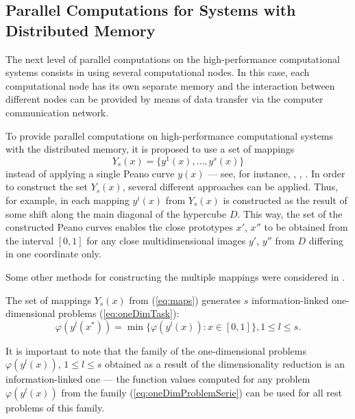 \documentclass{aims}
\theoremstyle{definition}
\begin{document}
\subsection{Parallel Computations for Systems with Distributed Memory}
\label{subsec:distribpar}
The next level of parallel computations on the high-performance computational systems
consists in using several computational nodes. In this case, each computational node has
its own separate memory and the interaction between different nodes can be provided by
means of data transfer via the computer communication network.
\par
To provide parallel computations on high-performance computational systems with the distributed memory, it is proposed to use a set of mappings
\begin{equation}
  \label{eq:maps}
Y_s(x)=\{y^1(x),\dots,y^s(x)\}
\end{equation}
instead of applying a single Peano curve \(y(x)\) --- see, for instance,
\cite{strongin1992}, \cite{stronginGergelBarkalovParGO}, \cite{strSergGO}.
In order to construct the set \(Y_s(x)\), several different approaches can be applied.
Thus, for example, in \cite{strongin1992} each mapping \(y^i(x)\) from \(Y_s(x)\) is constructed
as the result of some shift along the main diagonal of the hypercube \(D\). This way,
the set of the constructed Peano curves enables the close prototypes \(x'\), \(x''\)
to be obtained from the interval \([0, 1]\) for any close multidimensional images
\(y'\), \(y''\) from \(D\) differing in one coordinate only.
\par
Some other methods for constructing the multiple mappings were considered in \cite{stronginGergelBarkalovParGO}.
\par
The set of mappings \(Y_s(x)\) from (\ref{eq:maps}) generates \(s\) information-linked one-\linebreak
dimensional problems (\ref{eq:oneDimTask}):
\begin{equation}
  \label{eq:oneDimProblemSerie}
  \varphi(y^l(x^*))=\min\{\varphi(y^l(x)):x\in [0,1]\},1\leq l\leq s.
\end{equation}
\par
It is important to note that the family of the one-dimensional problems
$\varphi(y^l(x))$, $1 \leq l \leq s$ obtained as a result of the dimensionality
reduction is an information-linked one --- the function values computed for any
problem \(\varphi(y^l(x))\) from the family (\ref{eq:oneDimProblemSerie}) can be used for all rest problems of this family.
\par
\end{document}
